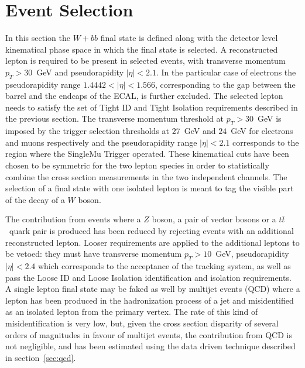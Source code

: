 \section{Event Selection}
\label{sec:wbbselection}

In this section the $W + bb$ final state is
defined along with the detector level kinematical
phase space in which the final state is selected.
A reconstructed lepton is required to be present
in selected events, with transverse momentum $p_{T} > 30$~GeV
and pseudorapidity $|\eta| < 2.1$. In the particular case of electrons
the pseudorapidity range $1.4442 < |\eta| < 1.566$, corresponding
to the gap between the barrel and the endcaps of the ECAL, is
further excluded. The selected lepton needs to satisfy the set of
Tight ID and Tight Isolation
requirements described in the previous section.
The transverse momentum threshold at $p_{T} > 30$~GeV is imposed by
the trigger selection thresholds at $27$~GeV and $24$~GeV for electrons and
muons respectively and the pseudorapidity range $|\eta| < 2.1$ corresponds to the
region where the SingleMu Trigger operated.
These kinematical cuts have been chosen to be symmetric for the two lepton
species in order to statistically combine the cross
section measurements in the two independent channels.
The selection of a final state with one isolated lepton is meant to tag the
visible part of the decay of a $W$ boson.

The contribution from events where a $Z$ boson, a pair of vector bosons
or a $t\bar{t}$~quark pair is produced has been reduced by rejecting
events with an additional reconstructed lepton. Looser requirements
are applied to the additional leptons to be vetoed: they must have transverse momentum
$p_{T} > 10$~GeV, pseudorapidity $|\eta| < 2.4$ which corresponds to the
acceptance of the tracking system, as well as pass the Loose ID and Loose Isolation
 identification and isolation requirements.
A single lepton final state may be faked as well by multijet events (QCD) where a lepton
has been produced in the hadronization process of a jet and misidentified
as an isolated lepton from the primary vertex.
The rate of this kind of misidentification is very low, but, given the cross
section disparity of several orders of magnitudes in favour of multijet events,
the contribution from QCD is not negligible, and has been estimated using the data driven
technique described in section~\ref{sec:qcd}. 

